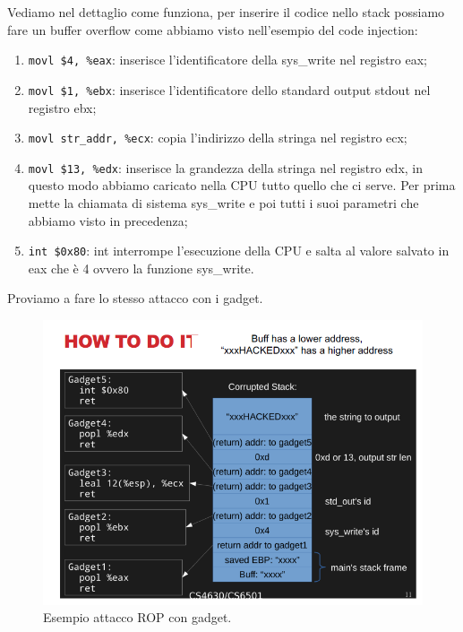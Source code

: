 Vediamo nel dettaglio come funziona, per inserire il codice nello stack possiamo
fare un buffer overflow come abbiamo visto nell'esempio del code injection:

\begin{enumerate}
    \item \verb|movl $4, %eax|: inserisce
          l'identificatore della sys\_write nel registro eax;
    \item \verb|movl $1, %ebx|: inserisce l'identificatore
          dello standard output stdout nel registro ebx;
    \item \verb|movl str_addr, %ecx|: copia l'indirizzo della stringa nel registro ecx;
    \item \verb|movl $13, %edx|: inserisce la grandezza della
          stringa nel registro edx, in questo modo abbiamo caricato nella
          CPU tutto quello che ci serve. Per prima mette la chiamata di
          sistema sys\_write e poi tutti i suoi parametri che abbiamo visto in
          precedenza;
    \item \verb|int $0x80|: int interrompe l'esecuzione della CPU e salta al
          valore salvato in eax che è 4 ovvero la funzione sys\_write.
\end{enumerate}

Proviamo a fare lo stesso attacco con i gadget.

\begin{figure}[H]
    \centering
    \includegraphics[width=13cm, keepaspectratio]{capitoli/secure_coding/img/cap_3/es_attacco_rop_gadget.png}
    \caption{Esempio attacco ROP con gadget.}\label{fig:es_attacco_rop_gadget}
\end{figure}

